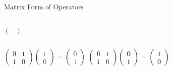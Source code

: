 \documentclass{beamer}
\begin{document}
\begin{frame}{Matrix Form of Operators}
\begin{columns}
\begin{math}
\begin{pmatrix}
            \end{pmatrix}
        \end{math}
    \end{columns}\vfill
    \pause
    \begin{columns}
        \centering
        \begin{math}
            \begin{pmatrix}
                0 & 1 \\ 1 & 0
            \end{pmatrix}
            \begin{pmatrix}
                1 \\ 0
            \end{pmatrix}
            = 
            \begin{pmatrix}
                0 \\ 1
            \end{pmatrix}
        \end{math}
        \centering
        \begin{math}
            \begin{pmatrix}
                0 & 1 \\ 1 & 0
            \end{pmatrix}
            \begin{pmatrix}
                0 \\ 1
            \end{pmatrix}
            = 
            \begin{pmatrix}
                1 \\ 0
            \end{pmatrix}
        \end{math}
    \end{columns}\vfill
\end{frame}
\end{document}

